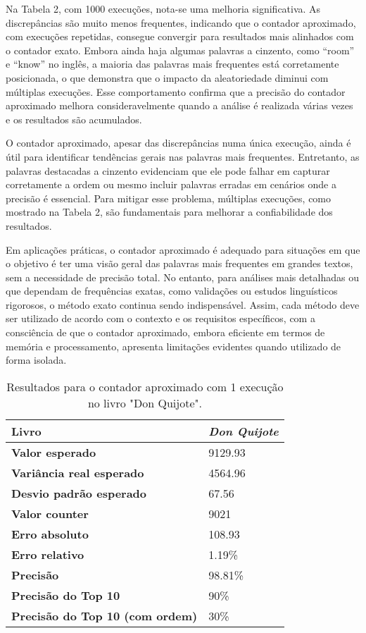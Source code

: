 \documentclass[shortpaper, portugues, times, mirror]{revdetua}
\begin{document}
Na Tabela 2, com 1000 execuções, nota-se uma melhoria significativa. As discrepâncias são muito menos frequentes, indicando que o contador aproximado, com execuções repetidas, consegue convergir para resultados mais alinhados com o contador exato. Embora ainda haja algumas palavras a cinzento, como “room” e “know” no inglês, a maioria das palavras mais frequentes está corretamente posicionada, o que demonstra que o impacto da aleatoriedade diminui com múltiplas execuções. Esse comportamento confirma que a precisão do contador aproximado melhora consideravelmente quando a análise é realizada várias vezes e os resultados são acumulados.

O contador aproximado, apesar das discrepâncias numa única execução, ainda é útil para identificar tendências gerais nas palavras mais frequentes. Entretanto, as palavras destacadas a cinzento evidenciam que ele pode falhar em capturar corretamente a ordem ou mesmo incluir palavras erradas em cenários onde a precisão é essencial. Para mitigar esse problema, múltiplas execuções, como mostrado na Tabela 2, são fundamentais para melhorar a confiabilidade dos resultados.

Em aplicações práticas, o contador aproximado é adequado para situações em que o objetivo é ter uma visão geral das palavras mais frequentes em grandes textos, sem a necessidade de precisão total. No entanto, para análises mais detalhadas ou que dependam de frequências exatas, como validações ou estudos linguísticos rigorosos, o método exato continua sendo indispensável. Assim, cada método deve ser utilizado de acordo com o contexto e os requisitos específicos, com a consciência de que o contador aproximado, embora eficiente em termos de memória e processamento, apresenta limitações evidentes quando utilizado de forma isolada.

\begin{table}[h!]
\centering
\begin{tabular}{|l|l|}
\hline
\textbf{Livro}            & \textit{Don Quijote} \\ \hline
\textbf{Valor esperado}         & 9129.93\\ \hline
\textbf{Variância real esperado}       & 4564.96\\ \hline
\textbf{Desvio padrão esperado}   & 67.56\\ \hline
\textbf{Valor counter}   & 9021\\ \hline
\textbf{Erro absoluto}   & 108.93\\ \hline
\textbf{Erro relativo}   & 1.19\%\\ \hline
\textbf{Precisão}   & 98.81\%\\ \hline
\textbf{Precisão do Top 10}   & 90\%\\ \hline
\textbf{Precisão do Top 10 (com ordem)}   & 30\%\\ \hline
\end{tabular}
\caption{Resultados para o contador aproximado com 1 execução no livro "Don Quijote".}
\label{tab:approximate}
\end{table}
\end{document}
